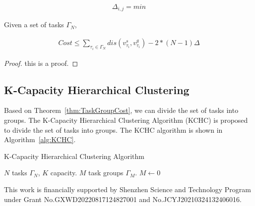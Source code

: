 \documentclass[sigconf,anonymous]{aamas}
\begin{document}

\begin{eqnarray}
  \label{eq:cp2}
  \Delta_{i,j} = min
\end{eqnarray}



\begin{theorem}
  \label{thm:TaskGroupCost}
  Given a set of tasks $\Gamma_{N}$, 
\end{theorem}

\begin{eqnarray}
\label{eq:tgc}
    Cost \leq \sum_{\tau_i \in \Gamma_N}{dis(v^{s}_{\tau_i}, v^{g}_{\tau_i})} - 2*(N-1)\Delta
\end{eqnarray}

\begin{proof}
    this is a proof.
\end{proof}

\subsection{K-Capacity Hierarchical Clustering}
Based on Theorem~\ref{thm:TaskGroupCost}, we can divide the set of tasks into groups.
The K-Capacity Hierarchical Clustering Algorithm (KCHC) is proposed to divide the set of tasks into groups.
The KCHC algorithm is shown in Algorithm~\ref{alg:KCHC}.

\begin{algorithm}[ht]
\caption{K-Capacity Hierarchical Clustering Algorithm}
\label{alg:KCHC}
\begin{algorithmic}
\REQUIRE $N$ tasks $\Gamma_{N}$, $K$ capacity.
\ENSURE $M$ task groups $\Gamma_{M}$.
\STATE $M \leftarrow 0$
\end{algorithmic}
\end{algorithm}




\begin{acks}
  This work is financially supported by Shenzhen Science and Technology Program 
  under Grant No.GXWD20220817124827001 and No.JCYJ20210324132406016.
\end{acks}



 


\end{document}
